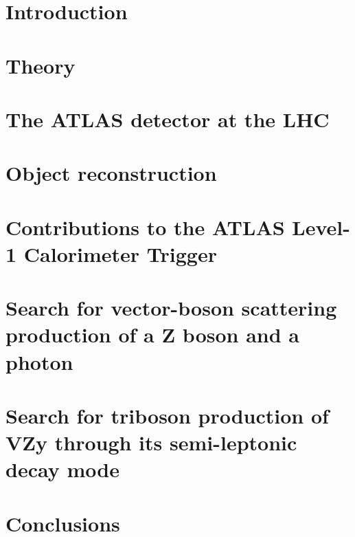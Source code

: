 \newcommand\relpath[1]{#1}
\newcommand\inputchapter[1]{}
\newcommand\resource[1]{#1}
\chapter{Introduction}
\inputchapter{introduction}

\chapter{Theory}
\inputchapter{theory}

\chapter{The ATLAS detector at the \acl{LHC}}
\inputchapter{detector}

\chapter{Object reconstruction}
\inputchapter{object-reco}

\chapter{Contributions to the ATLAS Level-1 Calorimeter Trigger}
\inputchapter{l1calo}

\chapter{Search for vector-boson scattering production of a Z boson and a photon}
\inputchapter{vbs}

\chapter{Search for triboson production of VZy through its semi-leptonic decay mode}
\inputchapter{vzy}

\chapter{Conclusions}
\inputchapter{conclusion}
